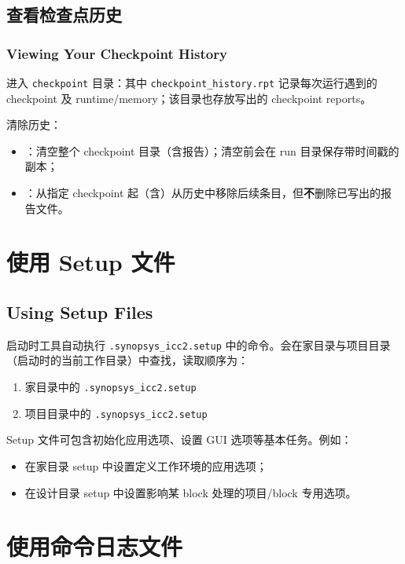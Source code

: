 \subsection{查看检查点历史}
\subsubsection*{Viewing Your Checkpoint History}

进入 \texttt{checkpoint} 目录：其中 \texttt{checkpoint\_history.rpt} 记录每次运行遇到的 checkpoint 及 runtime/memory；该目录也存放写出的 checkpoint reports。

清除历史：
\begin{itemize}
  \item {}：清空整个 checkpoint 目录（含报告）；清空前会在 run 目录保存带时间戳的副本；
  \item {}：从指定 checkpoint 起（含）从历史中移除后续条目，但\textbf{不}删除已写出的报告文件。
\end{itemize}

\section{使用 Setup 文件}
\subsection*{Using Setup Files}

启动时工具自动执行 \texttt{.synopsys\_icc2.setup} 中的命令。会在家目录与项目目录（启动时的当前工作目录）中查找，读取顺序为：
\begin{enumerate}
  \item 家目录中的 \texttt{.synopsys\_icc2.setup}
  \item 项目目录中的 \texttt{.synopsys\_icc2.setup}
\end{enumerate}

Setup 文件可包含初始化应用选项、设置 GUI 选项等基本任务。例如：
\begin{itemize}
  \item 在家目录 setup 中设置定义工作环境的应用选项；
  \item 在设计目录 setup 中设置影响某 block 处理的项目/block 专用选项。
\end{itemize}

\section{使用命令日志文件}
